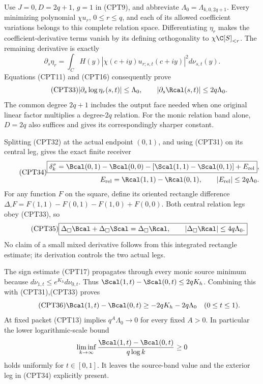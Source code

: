 \documentclass[11pt,a4paper]{article}
\begin{document}
Use \(J=0,D=2q+1\), \(g=1\) in (CPT9), and abbreviate
\(\Lambda_0=\Lambda_{k,0,2q+1}\).
Every minimizing polynomial \(\chi u_r\), \(0\le r\le q\),
and each of its allowed coefficient variations belongs to
this complete relation space.
Differentiating \(\eta_r\) makes the coefficient-derivative
terms vanish by its defining orthogonality to
\(\chi\C[S]_{<r}\).  The remaining derivative is exactly
\[
 \partial_s\eta_r
 =\int_C H(y)|\chi(c+iy)u_{r;s,t}(c+iy)|^2
                                             d\nu_{s,t}(y).
\]
Equations (CPT11) and (CPT16) consequently prove
\begin{equation}\tag{CPT33}
 |\partial_s\log\eta_r(s,t)|\le\Lambda_0,\qquad
 |\partial_s\Rcal(s,t)|\le2q\Lambda_0.
\end{equation}
The common degree \(2q+1\) includes the output face needed when
one original linear factor multiplies a degree-\(2q\) relation.
For the monic relation band alone, \(D=2q\) also suffices and
gives its correspondingly sharper constant.

Splitting (CPT32) at the actual endpoint \((0,1)\), and using
(CPT31) on its central leg, gives the exact finite receiver
\begin{equation}\tag{CPT34}
\begin{split}
 \boxed{\delta_k^\sigma
 =\Bcal(0,1)-\Bcal(0,0)
 -[\Scal(1,1)-\Scal(0,1)]+E_{\rm rel}},\\
 E_{\rm rel}=\Rcal(1,1)-\Rcal(0,1),\qquad
 |E_{\rm rel}|\le2q\Lambda_0.
\end{split}
\end{equation}
For any function \(F\) on the square, define its oriented
rectangle difference
\(\Delta_\square F=F(1,1)-F(0,1)-F(1,0)+F(0,0)\).
Both central relation legs obey (CPT33), so
\begin{equation}\tag{CPT35}
 \boxed{\Delta_\square\Bcal+\Delta_\square\Scal
       =\Delta_\square\Rcal,\qquad
 |\Delta_\square\Rcal|\le4q\Lambda_0.}
\end{equation}
No claim of a small mixed derivative follows from this integrated
rectangle estimate; its derivation controls the two actual legs.

The sign estimate (CPT17) propagates through every monic
source minimum because
\(d\nu_{1,t}\le e^{K_h}d\nu_{0,t}\).
Thus
\(\Scal(1,t)-\Scal(0,t)\le2qK_h\).
Combining this with (CPT31),(CPT33) proves
\begin{equation}\tag{CPT36}
 \Bcal(1,t)-\Bcal(0,t)\ge-2qK_h-2q\Lambda_0
 \quad(0\le t\le1).
\end{equation}
At fixed packet (CPT13) implies \(q^A\Lambda_0\to0\) for every
fixed \(A>0\).  In particular the lower logarithmic-scale bound
\[
 \liminf_{k\to\infty}
 \frac{\Bcal(1,t)-\Bcal(0,t)}{q\log k}\ge0
\]
holds uniformly for \(t\in[0,1]\).
It leaves the source-band value and the exterior leg in
(CPT34) explicitly present.
\end{document}
